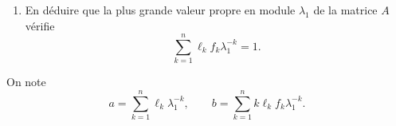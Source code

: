 \begin{enumerate}
{$$\begin{array}{cccccc}
            0 & s_2 & \ddots & \ddots & \vdots \\
            \vdots & \vdots & \ddots & \ddots & 0 \\
            0 & \cdots & 0 & s_{n-1} & -\lambda \\
          \end{array}\right|
  $$ 
  par rapport à la première ligne sont
  \begin{align*}
  (f_1 - \lambda) |B_1| & = (f_1-\lambda) (-\lambda^{n-1}), &
  - f_2 |B_2| & = -f_2 s_1 (-\lambda)^{n-2}, \\
  f_3 |B_3| & = f_3 s_1 s_2 (-\lambda)^{n-3}, & 
  -f_4 |B_4| & = -f_4 s_1 s_2 s_3 (-\lambda)^{n-4}, \qquad \dots
  \end{align*}
  }
  \item En déduire que la plus grande valeur propre en module $\lambda_1$ de la matrice $A$ vérifie
  $$
  \sum_{k=1}^n \ell_k f_k \lambda_1^{-k} = 1.
  $$
\end{enumerate}

On note 
$$
a = \sum_{k=1}^n \ell_k \lambda_1^{-k}, \qquad
b = \sum_{k=1}^n k \ell_k f_k \lambda_1^{-k}.
$$

